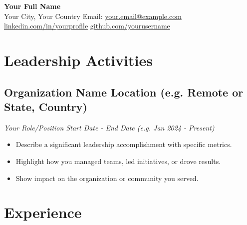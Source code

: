 \documentclass[a4paper,10pt]{article}
\begin{document}
\begin{center}
    {\LARGE \textbf{Your Full Name}} 
    \\ [0.1cm]
    Your City, Your Country 
    {\textbullet}
    Email: \href{mailto:your.email@example.com}{your.email@example.com} 
    {\textbullet}
    \href{https://www.linkedin.com/in/yourprofile}{linkedin.com/in/yourprofile} 
    {\textbullet}
    \href{https://github.com/yourusername}{github.com/yourusername}
\end{center}


\section{Leadership Activities} 
    \subsection*{\texorpdfstring{
            \textbf{Organization Name} \hfill Location (e.g. Remote or State, Country)
        }{
            Organization Name (Leadership) -- Location
        }}
    \textit{Your Role/Position \hfill Start Date - End Date (e.g. Jan 2024 - Present)}
        \begin{itemize}
            \item Describe a significant leadership accomplishment with specific metrics.
            \item Highlight how you managed teams, led initiatives, or drove results.
            \item Show impact on the organization or community you served.
        \end{itemize}


\section{Experience}
\end{document}
